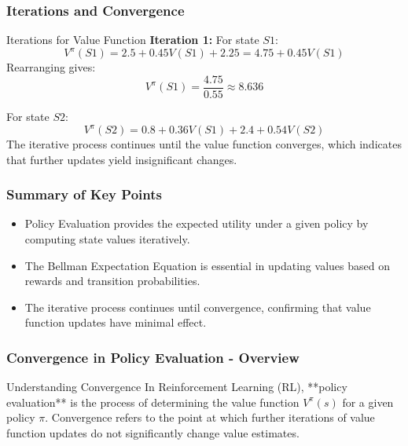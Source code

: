 \documentclass[aspectratio=169]{beamer}
\begin{document}
\begin{frame}[fragile]
    \frametitle{Iterations and Convergence}
    \begin{block}{Iterations for Value Function}
        \textbf{Iteration 1:} 
        For state $S1$:
        \[
        V^{\pi}(S1) = 2.5 + 0.45 V(S1) + 2.25 = 4.75 + 0.45 V(S1)
        \]
        Rearranging gives:
        \[
        V^{\pi}(S1) = \frac{4.75}{0.55} \approx 8.636
        \]

        For state $S2$:
        \[
        V^{\pi}(S2) = 0.8 + 0.36V(S1) + 2.4 + 0.54V(S2)
        \]
        The iterative process continues until the value function converges, which indicates that further updates yield insignificant changes.
    \end{block}
\end{frame}

\begin{frame}[fragile]
    \frametitle{Summary of Key Points}
    \begin{itemize}
        \item Policy Evaluation provides the expected utility under a given policy by computing state values iteratively.
        \item The Bellman Expectation Equation is essential in updating values based on rewards and transition probabilities.
        \item The iterative process continues until convergence, confirming that value function updates have minimal effect.
    \end{itemize}
\end{frame}

\begin{frame}[fragile]
    \frametitle{Convergence in Policy Evaluation - Overview}
    \begin{block}{Understanding Convergence}
        In Reinforcement Learning (RL), **policy evaluation** is the process of determining the value function \( V^\pi(s) \) for a given policy \( \pi \). Convergence refers to the point at which further iterations of value function updates do not significantly change value estimates.
    \end{block}
\end{frame}
\end{document}
